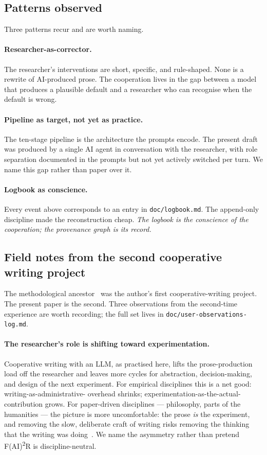 \subsection*{Patterns observed}

Three patterns recur and are worth naming.

\paragraph{Researcher-as-corrector.}
The researcher's interventions are short, specific, and rule-shaped.
None is a rewrite of AI-produced prose. The cooperation lives in the
gap between a model that produces a plausible default and a
researcher who can recognise when the default is wrong.

\paragraph{Pipeline as target, not yet as practice.}
The ten-stage pipeline is the architecture the prompts encode. The
present draft was produced by a single AI agent in conversation with
the researcher, with role separation documented in the prompts but
not yet actively switched per turn. We name this gap rather than
paper over it.

\paragraph{Logbook as conscience.}
Every event above corresponds to an entry in
\texttt{doc/logbook.md}. The append-only discipline made the
reconstruction cheap. \emph{The logbook is the conscience of the
cooperation; the provenance graph is its record.}

\subsection*{Field notes from the second cooperative writing project}

The methodological ancestor~\cite{krebs2026obscurity} was the
author's first cooperative-writing project. The present paper is the
second. Three observations from the second-time experience are worth
recording; the full set lives in
\texttt{doc/user-observations-log.md}.

\paragraph{The researcher's role is shifting toward experimentation.}
Cooperative writing with an LLM, as practised here, lifts the
prose-production load off the researcher and leaves more cycles for
abstraction, decision-making, and design of the next experiment. For
empirical disciplines this is a net good: writing-as-administrative-
overhead shrinks; experimentation-as-the-actual-contribution grows.
For paper-driven disciplines --- philosophy, parts of the humanities
--- the picture is more uncomfortable: the prose \emph{is} the
experiment, and removing the slow, deliberate craft of writing risks
removing the thinking that the writing was
doing~\cite{kuteeva2024diversity}. We name the
asymmetry rather than pretend F(AI)\textsuperscript{2}R is
discipline-neutral.


